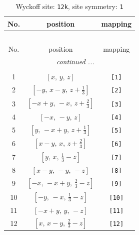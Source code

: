 \documentclass[fleqn,8pt]{jsarticle}
\begin{document}
\renewcommand{\arraystretch}{1.2}
\begin{longtable}{ccc}
\caption{Wyckoff site: {\tt 12k}, site symmetry: {\tt 1}}
 \\
 \hline \hline
No. & position & mapping \\ \hline \endfirsthead

\multicolumn{2}{l}{\tablename\ \thetable{}} \\
 \hline \hline
No. & position & mapping \\ \hline \endhead

 \hline \hline
\multicolumn{2}{r}{\footnotesize\it continued ...} \\ \endfoot

 \hline \hline
\multicolumn{2}{r}{} \\ \endlastfoot

1 & $\left[ x,\, y,\, z \right]$ & {\tt [1]} \\ \hline
2 & $\left[ - y,\, x - y,\, z + \frac{1}{3} \right]$ & {\tt [2]} \\ \hline
3 & $\left[ - x + y,\, - x,\, z + \frac{2}{3} \right]$ & {\tt [3]} \\ \hline
4 & $\left[ - x,\, - y,\, z \right]$ & {\tt [4]} \\ \hline
5 & $\left[ y,\, - x + y,\, z + \frac{1}{3} \right]$ & {\tt [5]} \\ \hline
6 & $\left[ x - y,\, x,\, z + \frac{2}{3} \right]$ & {\tt [6]} \\ \hline
7 & $\left[ y,\, x,\, \frac{1}{3} - z \right]$ & {\tt [7]} \\ \hline
8 & $\left[ x - y,\, - y,\, - z \right]$ & {\tt [8]} \\ \hline
9 & $\left[ - x,\, - x + y,\, \frac{2}{3} - z \right]$ & {\tt [9]} \\ \hline
10 & $\left[ - y,\, - x,\, \frac{1}{3} - z \right]$ & {\tt [10]} \\ \hline
11 & $\left[ - x + y,\, y,\, - z \right]$ & {\tt [11]} \\ \hline
12 & $\left[ x,\, x - y,\, \frac{2}{3} - z \right]$ & {\tt [12]} \\
\end{longtable}
\end{document}
